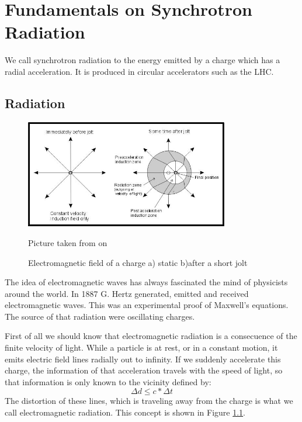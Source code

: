
\chapter{Fundamentals on Synchrotron Radiation} %

\label{sr} %


We call synchrotron radiation to the energy emitted by a charge which has a radial acceleration. It is produced in circular accelerators such as the LHC.

\section{Radiation}
\begin{figure}
	\centering
  \begin{minipage}{\textwidth}
  	\centering
   	\includegraphics[width=3.5in]{Pictures/efields.jpg}
  		\caption{\label{fig:campos}
   			Electromagnetic field of a charge a) static b)after a short jolt }
   			\footnotesize{Picture taken from on \citep{img1}}
   \end{minipage}
\end{figure}
The idea of electromagnetic waves has always fascinated the mind of physicists around the world. In 1887 G. Hertz generated, emitted and received electromagnetic waves. This was an experimental proof of Maxwell's equations. The source of that radiation were oscillating charges.

First of all we should know that electromagnetic radiation is a consecuence of the finite velocity of light\citep{libro}. While a particle is at rest, or in a constant motion, it emits electric field lines radially out to infinity. If we suddenly accelerate this charge, the information of that acceleration travels with the speed of light, so that information is only known to the vicinity defined by: \begin{equation}
\Delta d \leq c* \Delta t  
\end{equation}
The distortion of these lines, which is traveling away from the charge is what we call electromagnetic radiation. This concept is shown in Figure \ref{fig:campos}.

